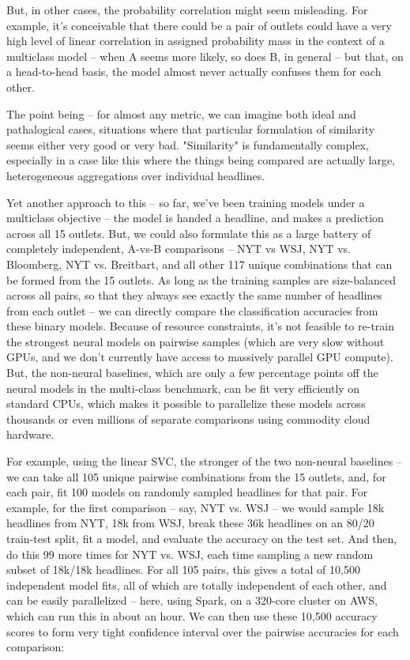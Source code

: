 \documentclass{scrartcl}
\begin{document}
But, in other cases, the probability correlation might seem misleading. For example, it's conceivable that there could be a pair of outlets could have a very high level of linear correlation in assigned probability mass in the context of a multiclass model -- when A seems more likely, so does B, in general -- but that, on a head-to-head basis, the model almost never actually confuses them for each other.

The point being -- for almost any metric, we can imagine both ideal and pathalogical cases, situations where that particular formulation of similarity seems either very good or very bad. "Similarity" is fundamentally complex, especially in a case like this where the things being compared are actually large, heterogeneous aggregations over individual headlines.

Yet another approach to this -- so far, we've been training models under a multiclass objective -- the model is handed a headline, and makes a prediction across all 15 outlets. But, we could also formulate this as a large battery of completely independent, A-vs-B comparisons -- NYT vs WSJ, NYT vs. Bloomberg, NYT vs. Breitbart, and all other 117 unique combinations that can be formed from the 15 outlets. As long as the training samples are size-balanced across all pairs, so that they always see exactly the same number of headlines from each outlet -- we can directly compare the classification accuracies from these binary models. Because of resource constraints, it's not feasible to re-train the strongest neural models on pairwise samples (which are very slow without GPUs, and we don't currently have access to massively parallel GPU compute). But, the non-neural baselines, which are only a few percentage points off the neural models in the multi-class benchmark, can be fit very efficiently on standard CPUs, which makes it possible to parallelize these models across thousands or even millions of separate comparisons using commodity cloud hardware.

For example, using the linear SVC, the stronger of the two non-neural baselines -- we can take all 105 unique pairwise combinations from the 15 outlets, and, for each pair, fit 100 models on randomly sampled headlines for that pair. For example, for the first comparison -- say, NYT vs. WSJ -- we would sample 18k headlines from NYT, 18k from WSJ, break these 36k headlines on an 80/20 train-test split, fit a model, and evaluate the accuracy on the test set. And then, do this 99 more times for NYT vs. WSJ, each time sampling a new random subset of 18k/18k headlines. For all 105 pairs, this gives a total of 10,500 independent model fits, all of which are totally independent of each other, and can be easily parallelized -- here, using Spark, on a 320-core cluster on AWS, which can run this in about an hour. We can then use these 10,500 accuracy scores to form very tight confidence interval over the pairwise accuracies for each comparison:
\end{document}

